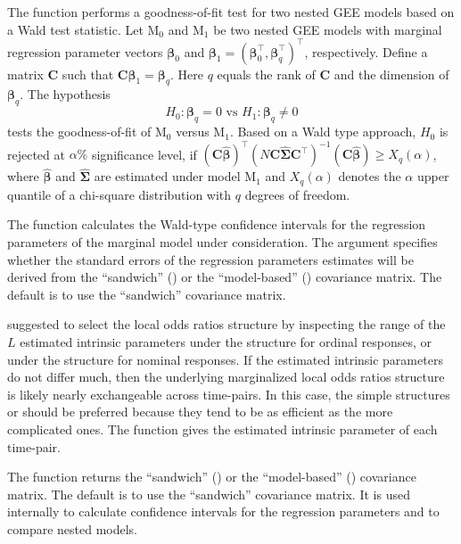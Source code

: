\documentclass[
]{jss}
\begin{document}
The function  performs a goodness-of-fit test for two
nested GEE models based on a Wald test statistic. Let \(\mathrm{M_0}\)
and \(\mathrm{M_1}\) be two nested GEE models with marginal regression
parameter vectors \(\boldsymbol \beta_0\) and
\(\boldsymbol \beta_1=(\boldsymbol \beta_0^{\top},\boldsymbol \beta^{\top}_q)^{\top}\),
respectively. Define a matrix \(\mathbf C\) such that
\(\mathbf C \boldsymbol \beta_1=\boldsymbol \beta_q\). Here \(q\) equals
the rank of \(\mathbf C\) and the dimension of \(\boldsymbol \beta_q\).
The hypothesis\\
\[H_0: \boldsymbol \beta_q=0 \text{ vs } H_1: \boldsymbol \beta_q \neq 0\]
tests the goodness-of-fit of \(\mathrm{M_0}\) versus \(\mathrm{M_1}\).
Based on a Wald type approach, \(H_0\) is rejected at \(\alpha \%\)
significance level, if
\((\mathbf C \widehat{\boldsymbol \beta})^{\top} (N\mathbf C \widehat{\boldsymbol \Sigma}\mathbf C^{\top})^{-1}(\mathbf C \widehat{\boldsymbol \beta}) \geq X_{q}(\alpha)\),
where \(\widehat{\boldsymbol \beta}\) and
\(\widehat{\boldsymbol \Sigma}\) are estimated under model
\(\mathrm{M_1}\) and \(X_{q}(\alpha)\) denotes the \(\alpha\) upper
quantile of a chi-square distribution with \(q\) degrees of freedom.

The function  calculates the Wald-type confidence
intervals for the regression parameters of the marginal model under
consideration. The  argument specifies whether the standard
errors of the regression parameters estimates will be derived from the
``sandwich'' () or the ``model-based''
() covariance matrix. The default is to use the
``sandwich'' covariance matrix.

\citet{Touloumis2012} suggested to select the local odds ratios
structure by inspecting the range of the \(L\) estimated intrinsic
parameters under the  structure for ordinal
responses, or under the  structure for nominal responses. If
the estimated intrinsic parameters do not differ much, then the
underlying marginalized local odds ratios structure is likely nearly
exchangeable across time-pairs. In this case, the simple structures
 or  should be preferred because they
tend to be as efficient as the more complicated ones. The function
 gives the estimated intrinsic parameter of each
time-pair.

The function  returns the ``sandwich''
() or the ``model-based''
() covariance matrix. The default is to use the
``sandwich'' covariance matrix. It is used internally to calculate
confidence intervals for the regression parameters and to compare nested
models.
\end{document}
